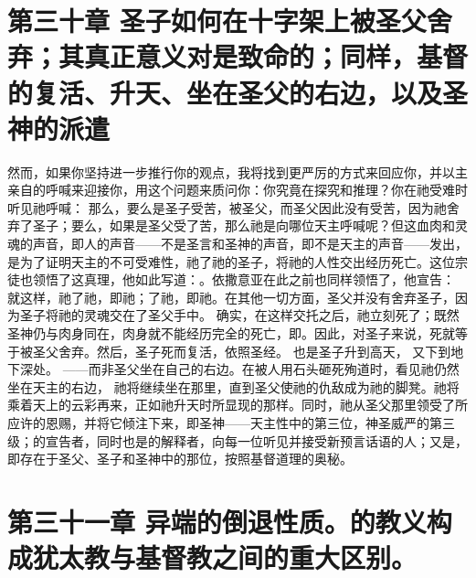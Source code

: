 
\section{第三十章 圣子如何在十字架上被圣父舍弃；其真正意义对是致命的；同样，基督的复活、升天、坐在圣父的右边，以及圣神的派遣}

然而，如果你坚持进一步推行你的观点，我将找到更严厉的方式来回应你，并以主亲自的呼喊来迎接你，用这个问题来质问你：你究竟在探究和推理？你在祂受难时听见祂呼喊： 那么，要么是圣子受苦，被圣父，而圣父因此没有受苦，因为祂舍弃了圣子；要么，如果是圣父受了苦，那么祂是向哪位天主呼喊呢？但这血肉和灵魂的声音，即人的声音——不是圣言和圣神的声音，即不是天主的声音——发出，是为了证明天主的不可受难性，祂了祂的圣子，将祂的人性交出经历死亡。这位宗徒也领悟了这真理，他如此写道：。依撒意亚在此之前也同样领悟了，他宣告： 就这样，祂了祂，即祂；了祂，即祂。在其他一切方面，圣父并没有舍弃圣子，因为圣子将祂的灵魂交在了圣父手中。 确实，在这样交托之后，祂立刻死了；既然圣神仍与肉身同在，肉身就不能经历完全的死亡，即。因此，对圣子来说，死就等于被圣父舍弃。然后，圣子死而复活，依照圣经。 也是圣子升到高天， 又下到地下深处。 ——而非圣父坐在自己的右边。在被人用石头砸死殉道时，看见祂仍然坐在天主的右边， 祂将继续坐在那里，直到圣父使祂的仇敌成为祂的脚凳。祂将乘着天上的云彩再来，正如祂升天时所显现的那样。同时，祂从圣父那里领受了所应许的恩赐，并将它倾注下来，即圣神——天主性中的第三位，神圣威严的第三级；的宣告者，同时也是的解释者，向每一位听见并接受新预言话语的人；又是， 即存在于圣父、圣子和圣神中的那位，按照基督道理的奥秘。\par


\section{第三十一章 异端的倒退性质。的教义构成犹太教与基督教之间的重大区别。}

